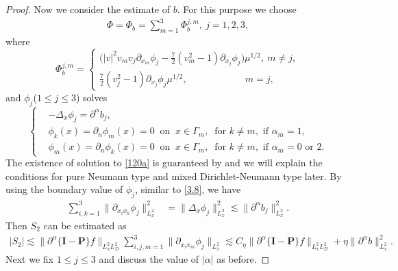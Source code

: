\documentclass[reqno,a4paper]{amsart}
\numberwithin{equation}{section}
\newcommand{\1}{\mathbf{1}}
\renewcommand{\P}{\mathbf{P}}
\newcommand{\<}{\langle}
\renewcommand{\>}{\rangle}
\newcommand{\I}{\mathbf{I}}
\renewcommand{\P}{\mathbf{P}}
\begin{document}
\begin{proof}
		
		\medskip {}
		Now we consider the estimate of ${b}$. For this purpose we choose 
		\begin{align*}
			{\Phi}={\Phi_b}=\sum^3_{m=1}{\Phi^{j,m}_b},\ j=1,2,3,
		\end{align*}
		where 
		\begin{equation*}
			{\Phi^{j,m}_b}=\left\{\begin{aligned}
				\big(|v|^2v_mv_j{\partial_{x_m}\phi_j}-\frac{7}{2}(v_m^2-1){\partial_{x_j}\phi_j}\big)\mu^{1/2},\ m\neq j,\\
				\frac{7}{2}(v_j^2-1){\partial_{x_j}\phi_j}\mu^{1/2},\qquad\qquad\qquad m=j,
			\end{aligned}\right.
		\end{equation*}
	and $\phi_j$($1\le j\le 3$) solves  
				\begin{equation}\label{120a}\left\{\begin{aligned}
						&-\Delta_x \phi_j = {\partial^\alpha b_j},\\
						&{\phi_k}(x) =\partial_n\phi_m(x)= 0 \ \text{ on }\ x\in \Gamma_m,\ \text{ for }k\neq m, \text{ if }\alpha_m = 1,\\
						&\phi_m(x)={\partial_n\phi_k}(x)= 0\ \text{ on }\ x\in \Gamma_m,\ \text{ for }k\neq m, \text{ if }\alpha_m = 0\text{ or } 2.
			\end{aligned}\right.
		\end{equation}
	The existence of solution to \eqref{120a} is guaranteed by \cite[Lamma 4.4.3.1]{Grisvard1985} and we will explain the conditions for pure Neumann type and mixed Dirichlet-Neumann type later. 
	By using the boundary value of $\phi_j$, similar to \eqref{3.8}, we have 
	\begin{equation}\label{3.18}\begin{aligned}
			\sum_{i,k=1}^3\|\partial_{x_ix_k}{\phi_j}\|_{L^2_{x}}^2& = \|\Delta_x\phi_j\|_{L^2_x}^2 \lesssim \|\partial^\alpha b_j\|^2_{L^2_x}.
		\end{aligned} 	
	\end{equation}
Then $S_2$ can be estimated as 
\begin{align}\label{3.19a}
	|S_2|\lesssim \|\partial^\alpha\{\I-\P\}f\|_{L^2_xL^2_D}\sum_{i,j,m=1}^3\|\partial_{x_ix_m}\phi_j\|_{L^2_x}
	\lesssim C_\eta\|\partial^\alpha\{\I-\P\}f\|_{L^2_xL^2_D}+\eta \|\partial^\alpha b\|^2_{L^2_x}.
\end{align}
	Next we fix $1\le j\le 3$ and discuss the value of $|\alpha|$ as before.
	

\end{proof}
\end{document}
